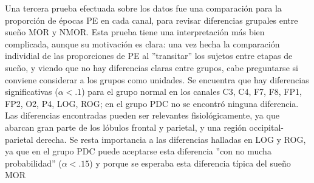 Una tercera prueba efectuada sobre los datos fue una comparaci\'on para la proporci\'on de \'epocas
PE en cada canal, para revisar diferencias grupales entre sue\~no MOR y NMOR.
Esta prueba tiene una interpretaci\'on m\'as bien complicada, aunque su motivaci\'on es clara:
una vez hecha la comparaci\'on individial de las proporciones de PE al 
''transitar'' los sujetos entre etapas de sue\~no, y viendo que 
no hay diferencias claras entre grupos, cabe preguntarse si conviene considerar a los grupos 
como unidades.
Se encuentra que hay diferencias significativas ($\alpha<.1$) para el grupo normal
en los canales C3, C4, F7, F8, FP1, FP2, O2, P4, LOG, ROG; en el grupo PDC no se encontr\'o
ninguna diferencia.
Las diferencias encontradas pueden ser relevantes fisiol\'ogicamente, ya que 
abarcan gran parte de los l\'obulos frontal y parietal, y una regi\'on occipital-parietal derecha.
Se resta importancia a las diferencias halladas en LOG y ROG, ya que en el grupo PDC puede
aceptarse esta diferencia ''con no mucha probabilidad'' ($\alpha<.15$) y porque se esperaba
esta diferencia t\'ipica del sue\~no MOR

